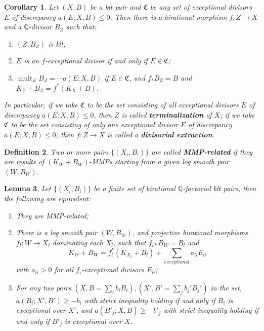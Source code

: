 \documentclass[11pt]{amsart}
\newtheorem{defn}{Definition}[section]
\newtheorem{lem}[defn]{Lemma}
\newtheorem{cor}[defn]{Corollary}
\begin{document}
\begin{cor}\label{extraction}
  \cite[Corollary 13.7]{haconMinimalModelProgram2012} Let $ (X,B) $ be a  klt pair and $\mathfrak{C}$ be any set of exceptional divisors $E$  of discrepancy $ a(E;X,B)\leqslant 0 $. Then there is a birational morphism $ f:Z\to X $ and a $ \mathbb{Q} $-divisor $ B_Z $ such that:
  \begin{enumerate}
    \item $ (Z,B_Z) $ is klt;
    \item $ E $ is an $f$-exceptional divisor if and only if $ E\in \mathfrak{C} $;
    \item $ \operatorname{mult}_{E}B_Z=-a(E;X,B) $ if $E \in \mathfrak{C}$, and $ f_*B_Z=B $ and $ K_Z+B_Z=f^*(K_X+B) $.
  \end{enumerate} 
  In particular, if we take $\mathfrak{C}$ to be the set consisting of  all exceptional divisors $E$ of discrepancy $a(E;X,B)\leqslant 0$, then $ Z $ is called \textbf{terminalization} of $ X $; if we take $\mathfrak{C}$ to be the set consisting of only one exceptional divisor $E$ of discrepancy $a(E;X,B)\leqslant 0$, then $ f:Z\to X $ is called a \textbf{divisorial extraction}.    
\end{cor}

\begin{defn}
  \cite[Definition 3.3]{brunoLogSarkisovProgram1995}
  Two or more pairs $ \{(X_i,B_i)\} $ are called \textbf{MMP-related} if they are results of $ (K_W+B_W) $-MMPs starting from a given log smooth pair $(W,B_{W})$.
\end{defn}
 \begin{lem}\label{MMPrelatedConditation}
  \cite[Proposition 3.4]{brunoLogSarkisovProgram1995}
  Let $ \{(X_l,B_l)\} $ be a finite set of birational $ \mathbb{Q} $-factorial klt pairs, then the following are equivalent:
  \begin{enumerate}
    \item They are MMP-related;
    \item There is a log smooth pair $ (W,B_W) $, and projective birational morphisms $ f_l:W\to  X_l $ dominating each $ X_l $, such that $ f_{l*}B_W=B_l $ and
      \[ K_W+B_W=f_l^*(K_{X_l}+B_l)+\sum_{exceptional}{a_{li}E_{li}} \]
      with $ a_{li}>0 $ for all $ f_i $-exceptional divisors $E_{li}$;
    \item For any two pairs $ (X,B=\sum_ib_iB_i),(X',B'=\sum _jb_j'B_j') $ in the set,  $ a(B_i;X',B')\geqslant -b_i $ with strict inequality holding if and only if $ B_i $ is exceptional over $ X' $, and $ a(B'_j;X,B)\geqslant -b'_j $ with strict inequality holding if and only if $ B'_j $ is exceptional over $ X $.
  \end{enumerate}
\end{lem}
\end{document}
